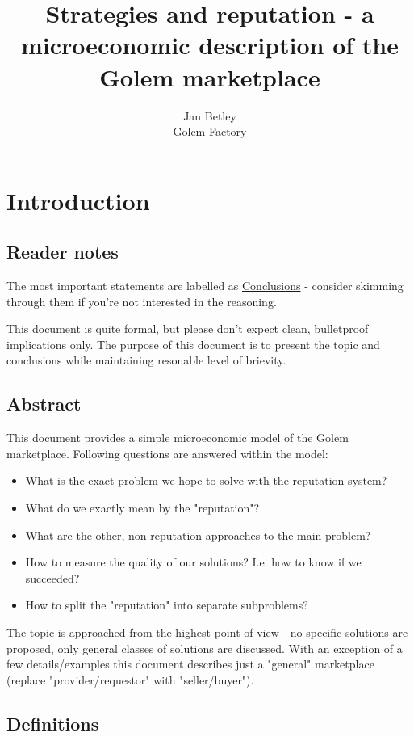 \documentclass{article}
\title{Strategies and reputation - a microeconomic description of the Golem marketplace}
\author{Jan Betley\\ Golem Factory}
\begin{document}
\maketitle
\section{Introduction}
\subsection{Reader notes}

The most important statements are labelled as \underline{Conclusions} - consider skimming through them if you're not interested in the reasoning.

This document is quite formal, but please don't expect clean, bulletproof implications only. The purpose of this document is to
present the topic and conclusions while maintaining resonable level of brievity.

\subsection{Abstract}
This document provides a simple microeconomic model of the Golem marketplace. 
Following questions are answered within the model:

\begin{itemize}
\item What is the exact problem we hope to solve with the reputation system?
\item What do we exactly mean by the "reputation"?
\item What are the other, non-reputation approaches to the main problem?
\item How to measure the quality of our solutions? I.e. how to know if we succeeded?
\item How to split the "reputation" into separate subproblems?
\end{itemize}

The topic is approached from the highest point of view - no specific solutions are proposed, only general classes of solutions are discussed.
With an exception of a few details/examples this document describes just a "general" marketplace (replace "provider/requestor" with "seller/buyer").

\subsection{Definitions}
\end{document}
